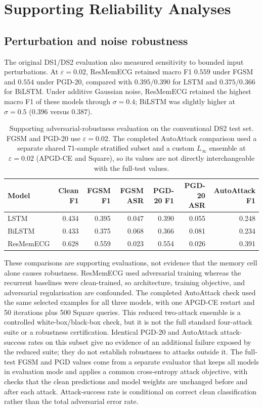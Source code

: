 \documentclass[pdflatex,sn-mathphys-num]{sn-jnl}
\begin{document}
\section{Supporting Reliability Analyses}
\subsection{Perturbation and noise robustness}
The original DS1/DS2 evaluation also measured sensitivity to bounded input
perturbations. At $\varepsilon=0.02$,
ResMemECG retained macro F1 $0.559$ under FGSM and $0.554$ under PGD-20,
compared with $0.395/0.390$ for LSTM and $0.375/0.366$ for BiLSTM. Under
additive Gaussian noise, ResMemECG retained
the highest macro F1 of these models through $\sigma=0.4$; BiLSTM was slightly
higher at $\sigma=0.5$ ($0.396$ versus $0.387$).

\begin{table}[htbp]
\caption{Supporting adversarial-robustness evaluation on the conventional DS2
test set. FGSM and PGD-20 use $\varepsilon=0.02$. The completed AutoAttack
comparison used a separate shared 71-sample stratified subset and a custom
$L_\infty$ ensemble at $\varepsilon=0.02$ (APGD-CE and Square), so its values
are not directly interchangeable with the full-test values.}
\label{tab:adversarial-summary}
\centering
\small
\setlength{\tabcolsep}{3pt}
\begin{tabular}{@{}lrrrrrr@{}}
\toprule
Model & Clean F1 & FGSM F1 & FGSM ASR & PGD-20 F1 & PGD-20 ASR & AutoAttack F1 \\
\midrule
LSTM       & 0.434 & 0.395 & 0.047 & 0.390 & 0.055 & 0.248 \\
BiLSTM     & 0.433 & 0.375 & 0.068 & 0.366 & 0.081 & 0.234 \\
ResMemECG  & 0.628 & 0.559 & 0.023 & 0.554 & 0.026 & 0.391 \\
\bottomrule
\end{tabular}
\end{table}

These comparisons are supporting evaluations, not evidence that the memory cell
alone causes robustness. ResMemECG used adversarial training whereas the
recurrent baselines were clean-trained, so architecture, training objective, and
adversarial regularisation are confounded. The completed AutoAttack check used
the same selected examples for all three models, with one APGD-CE restart and
50 iterations plus 500 Square queries. This reduced two-attack ensemble is a
controlled white-box/black-box check, but it is not the full standard four-attack
suite or a robustness certification. Identical PGD-20 and AutoAttack attack-
success rates on this subset give no evidence of an additional failure exposed
by the reduced suite; they do not establish robustness to attacks outside it.
The full-test FGSM and PGD values come from a separate evaluator that keeps all
models in evaluation mode and applies a common cross-entropy attack objective,
with checks that the clean predictions and model weights are unchanged before
and after each attack. Attack-success rate is conditional on correct clean
classification rather than the total adversarial error rate.
\end{document}
